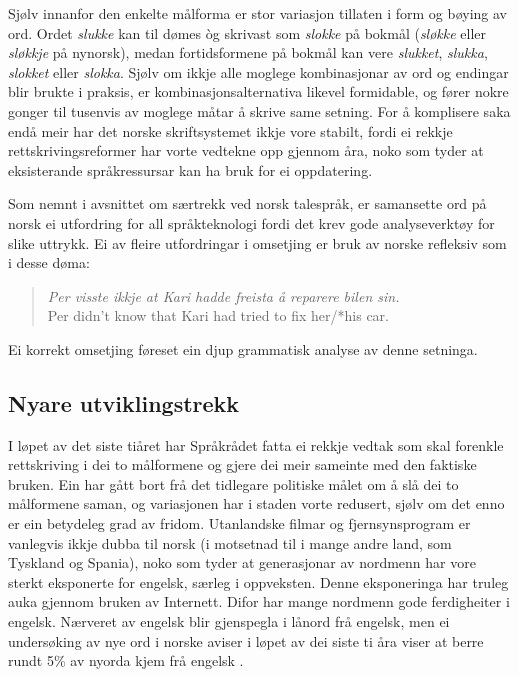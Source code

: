 \begin{multicols}{2}
Sjølv innanfor den enkelte målforma er stor variasjon tillaten i form og bøying av ord. Ordet \textit{slukke} kan til dømes òg skrivast som \textit{slokke} på bokmål (\textit{sløkke} eller \textit{sløkkje} på nynorsk), medan fortidsformene på bokmål kan vere \textit{slukket}, \textit{slukka}, \textit{slokket} eller \textit{slokka}. 
Sjølv om ikkje alle moglege kombinasjonar av ord og endingar blir brukte i praksis, er kombinasjonsalternativa likevel formidable, og fører nokre gonger til tusenvis av moglege måtar å skrive same setning. 
For å komplisere saka endå meir har det norske skriftsystemet ikkje vore stabilt, fordi ei rekkje rettskrivingsreformer har vorte vedtekne opp gjennom åra, noko som tyder at eksisterande språkressursar kan ha bruk for ei oppdatering. 

Som nemnt i avsnittet om særtrekk ved norsk talespråk, er samansette ord på norsk ei utfordring for all språkteknologi fordi det krev gode analyseverktøy for slike uttrykk.
Ei av fleire utfordringar i omsetjing er bruk av norske refleksiv som i desse døma:

\begin{quote} 
	\emph{Per visste ikkje at Kari hadde freista å reparere bilen \emph{sin}.}\\
	Per didn’t know that Kari had tried to fix her/*his car.
\end{quote}

Ei korrekt omsetjing føreset ein djup grammatisk analyse av denne setninga. 

\subsection{Nyare utviklingstrekk}

I løpet av det siste tiåret har Språkrådet fatta ei rekkje vedtak som skal forenkle rettskriving i dei to målformene og gjere dei meir sameinte med den faktiske bruken. Ein har gått bort frå det tidlegare politiske målet om å slå dei to målformene saman, og variasjonen har i staden vorte redusert, sjølv om det enno er ein betydeleg grad av fridom. 
Utanlandske filmar og fjernsynsprogram er vanlegvis ikkje dubba til norsk (i motsetnad til i mange andre land, som Tyskland og Spania), noko som tyder at generasjonar av nordmenn har vore sterkt eksponerte for engelsk, særleg i oppveksten. 
Denne eksponeringa har truleg auka gjennom bruken av Internett. 
Difor har mange nordmenn gode ferdigheiter i engelsk. 
Nærveret av engelsk blir gjenspegla i lånord frå engelsk, men ei undersøking av nye ord i norske aviser i løpet av dei siste ti åra viser at berre rundt 5\% av nyorda kjem frå engelsk \cite{And:2011}.


\end{multicols}
